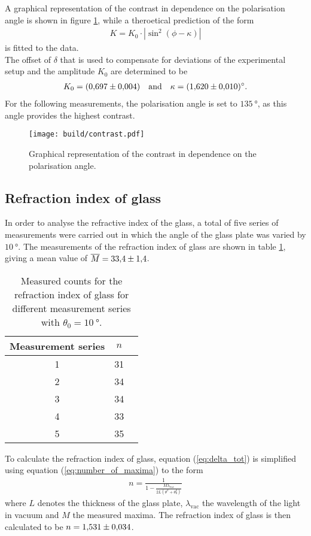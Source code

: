 \noindent
A graphical representation of the contrast in dependence on the polarisation angle is shown in figure \ref{fig:contrast}, while a theroetical prediction of the form
\begin{align}
    K = K_0\cdot|\sin^2(\phi-\kappa)|
\end{align}
is fitted to the data.\\
The offset of $\delta$ that is used to compensate for deviations of the experimental setup and the amplitude $K_0$ are determined to be
\begin{align*}
    K_0=\SI{0.697\pm0.004}{} \quad \text{and} \quad \kappa=\SI{1.620\pm0.010}{\degree}.
\end{align*}
For the following measurements, the polarisation angle is set to $\SI{135}{\degree}$, as this angle provides the highest contrast.
\begin{figure}[H]
    \centering
    \texttt{[image: build/contrast.pdf]}
    \caption{Graphical representation of the contrast in dependence on the polarisation angle.}
    \label{fig:contrast}
\end{figure}

\subsection{Refraction index of glass}
\label{subsec:refraction_glass}

In order to analyse the refractive index of the glass, a total of five series of measurements were carried out in which the angle of the glass plate was varied by $\SI{10}{\degree}$.
The measurements of the refraction index of glass are shown in table \ref{tab:refraction_glass}, giving a mean value of $\overline M=\num{33.4\pm1.4}$.
\begin{table}[H]
    \centering
    \begin{tabular}{c c c}
        \toprule
        Measurement series & $n$ \\
        \midrule
        1 & 31 \\
        2 & 34 \\
        3 & 34 \\
        4 & 33 \\
        5 & 35 \\
        \bottomrule
    \end{tabular}
    \caption{Measured counts for the refraction index of glass for different measurement series with $\theta_0=\SI{10}{\degree}$.}
    \label{tab:refraction_glass}
\end{table}
\noindent
To calculate the refraction index of glass, equation (\ref{eq:delta_tot}) is simplified using equation (\ref{eq:number_of_maxima}) to the form
\begin{align}
    n = \frac{1}{1-\frac{M\lambda_{\text{vac}}}{2 L(\theta^2 + \theta_0^2)}}
\end{align}
where $L$ denotes the thickness of the glass plate, $\lambda_\text{vac}$ the wavelength of the light in vacuum and $M$ the measured maxima.
The refraction index of glass is then calculated to be $n=\num{1.531 \pm 0.034}$.

